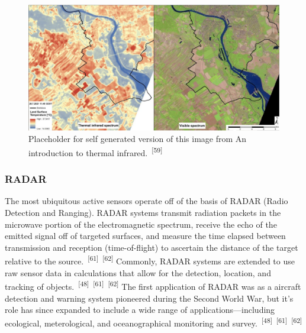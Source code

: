 \documentclass{article}
\begin{document}

\begin{figure}
    \centering
    \includegraphics[width=1\linewidth]{images/thermal-vs-visible.png}
    \caption{Placeholder for self generated version of this image from An introduction to thermal infrared.~\textsuperscript{[59]}}
    \label{figure15}
\end{figure}

\subsubsection{RADAR}


\par{The most ubiquitous active sensors operate off of the basis of RADAR (Radio Detection and Ranging). RADAR systems transmit radiation packets in the microwave portion of the electromagnetic spectrum, receive the echo of the emitted signal off of targeted surfaces, and measure the time elapsed between transmission and reception (time-of-flight) to ascertain the distance of the target relative to the source.~\textsuperscript{[61]}~\textsuperscript{[62]} Commonly, RADAR systems are extended to use raw sensor data in calculations that allow for the detection, location, and tracking of objects.~\textsuperscript{[48]}~\textsuperscript{[61]}~\textsuperscript{[62]} The first application of RADAR was as a aircraft detection and warning system pioneered during the Second World War, but it's role has since expanded to include a wide range of applications---including ecological, meterological, and oceanographical monitoring and survey.~\textsuperscript{[48]}~\textsuperscript{[61]}~\textsuperscript{[62]}}

\end{document}
